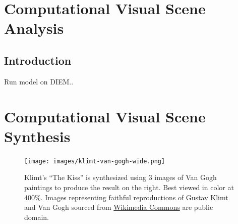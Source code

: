 \documentclass[a4paper,10pt,final]{ThesisStyle}
\begin{document}




\chapter{Computational Visual Scene Analysis}
\label{ch:analysis-visual}
\minitoc

\section{Introduction}  

Run model on DIEM..






\chapter{Computational Visual Scene Synthesis}
\label{ch:synthesis-visual}
\minitoc

\begin{figure}[ht]
 \texttt{[image: images/klimt-van-gogh-wide.png]}
 \caption{Klimt's ``The Kiss'' is synthesized using 3 images of Van Gogh paintings to produce the result on the right.  Best viewed in color at 400\%.  Images representing faithful reproductions of Gustav Klimt and Van Gogh sourced from \href{http://commons.wikimedia.org}{Wikimedia Commons} are public domain.}
 \label{fig:teaser}
\end{figure}
\end{document}
